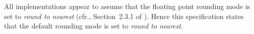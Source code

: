\documentclass[../Rounding-Modes.tex]{subfiles}
\begin{document}
All \CL{} implementations appear to assume that the floating point
rounding mode is set to \emph{round to nearest} (cfr., Section~2.3.1 of \cite{1996:ANSIHyperSpec}).  Hence this
specification states that the default rounding mode is set to \emph{round
  to nearest}.
\end{document}
